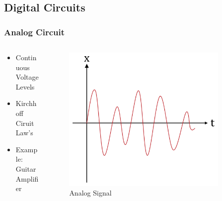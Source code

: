 \documentclass{beamer}
\begin{document}
\subsection{Digital Circuits}
\begin{frame}\frametitle{Analog Circuit}
  \begin{columns}
  \begin{column}{6cm}
  \begin{itemize}
   \item Continuous Voltage Levels
   \item Kirchhoff Ciruit Law's
   \item Example: Guitar Amplifier

  \end{itemize}


  \end{column}
  \begin{column}{6cm}
  \begin{figure}
  \includegraphics[width=0.9\textwidth]{analog}
  \caption{Analog Signal}
  \end{figure}
  \end{column}
  \end{columns}
\end{frame}
\end{document}

